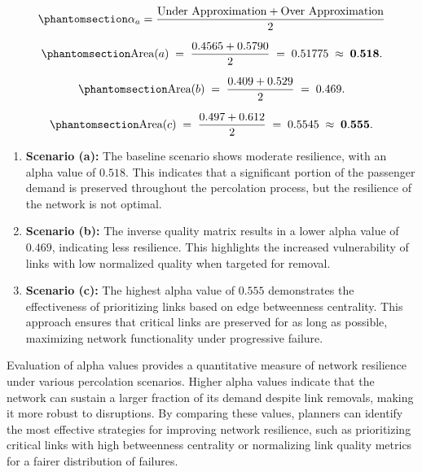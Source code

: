 \documentclass[
  letterpaper,
  DIV=11,
  numbers=noendperiod]{scrartcl}
\providecommand{\tightlist}{%
  \setlength{\itemsep}{0pt}\setlength{\parskip}{0pt}}\usepackage{longtable,booktabs,array}
\begin{document}
\begin{equation}\phantomsection\label{eq-alpha}{
\alpha_a = \frac{\text{Under Approximation} + \text{Over Approximation}}{2}
}\end{equation}

\begin{equation}\phantomsection\label{eq-alpha-a}{
\text{Area}(a) \;=\; \frac{0.4565 + 0.5790}{2} \;=\; 0.51775 \;\approx\; \mathbf{0.518}.
}\end{equation}

\begin{equation}\phantomsection\label{eq-alpha-b}{
\text{Area}(b) \;=\; \frac{0.409 + 0.529}{2} \;=\; 0.469.
}\end{equation}

\begin{equation}\phantomsection\label{eq-alpha-c}{
\text{Area}(c) \;=\; \frac{0.497 + 0.612}{2} \;=\; 0.5545 \;\approx\; \mathbf{0.555}.
}\end{equation}

\begin{enumerate}
\def\labelenumi{\arabic{enumi}.}
\tightlist
\item
  \textbf{Scenario (a):} The baseline scenario shows moderate
  resilience, with an alpha value of \(0.518\). This indicates that a
  significant portion of the passenger demand is preserved throughout
  the percolation process, but the resilience of the network is not
  optimal.
\item
  \textbf{Scenario (b):} The inverse quality matrix results in a lower
  alpha value of \(0.469\), indicating less resilience. This highlights
  the increased vulnerability of links with low normalized quality when
  targeted for removal.
\item
  \textbf{Scenario (c):} The highest alpha value of \(0.555\)
  demonstrates the effectiveness of prioritizing links based on edge
  betweenness centrality. This approach ensures that critical links are
  preserved for as long as possible, maximizing network functionality
  under progressive failure.
\end{enumerate}

Evaluation of alpha values provides a quantitative measure of network
resilience under various percolation scenarios. Higher alpha values
indicate that the network can sustain a larger fraction of its demand
despite link removals, making it more robust to disruptions. By
comparing these values, planners can identify the most effective
strategies for improving network resilience, such as prioritizing
critical links with high betweenness centrality or normalizing link
quality metrics for a fairer distribution of failures.
\end{document}
